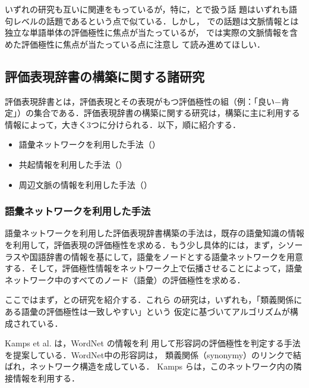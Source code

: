 いずれの研究も互いに関連をもっているが，特に，とで扱う話
題はいずれも語句レベルの話題であるという点で似ている．しかし， 
での話題は文脈情報とは独立な単語単体の評価極性に焦点が当たっているが，
では実際の文脈情報を含めた評価極性に焦点が当たっている点に注意し
て読み進めてほしい．

\subsection{評価表現辞書の構築に関する諸研究}
\label{sec:se}

評価表現辞書とは，評価表現とその表現がもつ評価極性の組（例：「良い−肯
定」）の集合である．評価表現辞書の構築に関する研究は，構築に主に利用する
情報によって，大きく3つに分けられる．以下，順に紹介する．

\begin{itemize}
 \item 語彙ネットワークを利用した手法（）
 \item 共起情報を利用した手法（）
 \item 周辺文脈の情報を利用した手法（）
\end{itemize}

\subsubsection{語彙ネットワークを利用した手法}
\label{sec:lex_net}

語彙ネットワークを利用した評価表現辞書構築の手法は，既存の語彙知識の情報
を利用して，評価表現の評価極性を求める．もう少し具体的には，まず，シソー
ラスや国語辞書の情報を基にして，語彙をノードとする語彙ネットワークを用意
する．そして，評価極性情報をネットワーク上で伝播させることによって，語彙
ネットワーク中のすべてのノード（語彙）の評価極性を求める．

ここではまず，\cite{kamps2004a}と\cite{hu2004a}の研究を紹介する．これら
の研究は，いずれも，「類義関係にある語彙の評価極性は一致しやすい」という
仮定に基づいてアルゴリズムが構成されている．

\vspace{1em}
\underline{\textbf{\cite{kamps2004a}}}
\vspace{1em}

Kamps et al. \cite{kamps2004a}は，WordNet \cite{fellbaum1998a}の情報を利
用して形容詞の評価極性を判定する手法を提案している．WordNet中の形容詞は，
類義関係（synonymy）のリンクで結ばれ，ネットワーク構造を成している．
Kamps らは，このネットワーク内の隣接情報を利用する．

